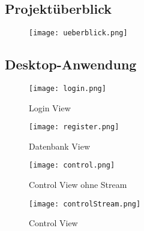 

\chapter{}

\section{Projektüberblick}\label{A.überblick}

\begin{figure}[h]
  \begin{center}
    \texttt{[image: ueberblick.png]}
     \label{fig.Views}
  \end{center}
\end{figure}



\newpage



\section{Desktop-Anwendung}\label{A.desktop}

\begin{figure}[h]
\begin{minipage}[h]{8cm}
	\centering
	\texttt{[image: login.png]}
	\caption{Login View}
\end{minipage}
\hfill
\begin{minipage}[h]{8cm}
	\centering
	\texttt{[image: register.png]}
	\caption{Datenbank View}
\end{minipage}
\end{figure}


\vspace{3cm}


\begin{figure}[h]
\begin{minipage}[h]{8cm}
	\centering
	\texttt{[image: control.png]}
	\caption{Control View ohne Stream}
\end{minipage}
\hfill
\begin{minipage}[h]{8cm}
	\centering
	\texttt{[image: controlStream.png]}
	\caption{Control View}
\end{minipage}
\end{figure}


